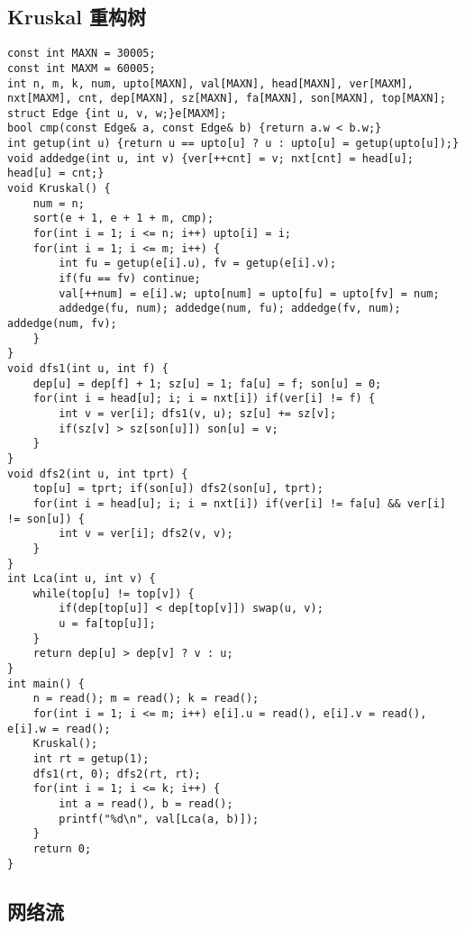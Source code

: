 \documentclass{article}
\begin{document}
   \subsection{Kruskal 重构树}
\begin{lstlisting}
const int MAXN = 30005;
const int MAXM = 60005;
int n, m, k, num, upto[MAXN], val[MAXN], head[MAXN], ver[MAXM], nxt[MAXM], cnt, dep[MAXN], sz[MAXN], fa[MAXN], son[MAXN], top[MAXN];
struct Edge {int u, v, w;}e[MAXM];
bool cmp(const Edge& a, const Edge& b) {return a.w < b.w;}
int getup(int u) {return u == upto[u] ? u : upto[u] = getup(upto[u]);}
void addedge(int u, int v) {ver[++cnt] = v; nxt[cnt] = head[u]; head[u] = cnt;}
void Kruskal() {
	num = n;
	sort(e + 1, e + 1 + m, cmp);
	for(int i = 1; i <= n; i++) upto[i] = i;
	for(int i = 1; i <= m; i++) {
		int fu = getup(e[i].u), fv = getup(e[i].v);
		if(fu == fv) continue;
		val[++num] = e[i].w; upto[num] = upto[fu] = upto[fv] = num;
		addedge(fu, num); addedge(num, fu); addedge(fv, num); addedge(num, fv);
	}
}
void dfs1(int u, int f) {
	dep[u] = dep[f] + 1; sz[u] = 1; fa[u] = f; son[u] = 0;
	for(int i = head[u]; i; i = nxt[i]) if(ver[i] != f) {
		int v = ver[i]; dfs1(v, u); sz[u] += sz[v];
		if(sz[v] > sz[son[u]]) son[u] = v;
	}
}
void dfs2(int u, int tprt) {
	top[u] = tprt; if(son[u]) dfs2(son[u], tprt);
	for(int i = head[u]; i; i = nxt[i]) if(ver[i] != fa[u] && ver[i] != son[u]) {
		int v = ver[i]; dfs2(v, v);
	}
}
int Lca(int u, int v) {
	while(top[u] != top[v]) {
		if(dep[top[u]] < dep[top[v]]) swap(u, v);
		u = fa[top[u]];
	}
	return dep[u] > dep[v] ? v : u;
}
int main() {
	n = read(); m = read(); k = read();
	for(int i = 1; i <= m; i++) e[i].u = read(), e[i].v = read(), e[i].w = read();
	Kruskal();
	int rt = getup(1);
	dfs1(rt, 0); dfs2(rt, rt);
	for(int i = 1; i <= k; i++) {
		int a = read(), b = read();
		printf("%d\n", val[Lca(a, b)]);
	}
	return 0;
}
\end{lstlisting}
\subsection{网络流}
\end{document}

